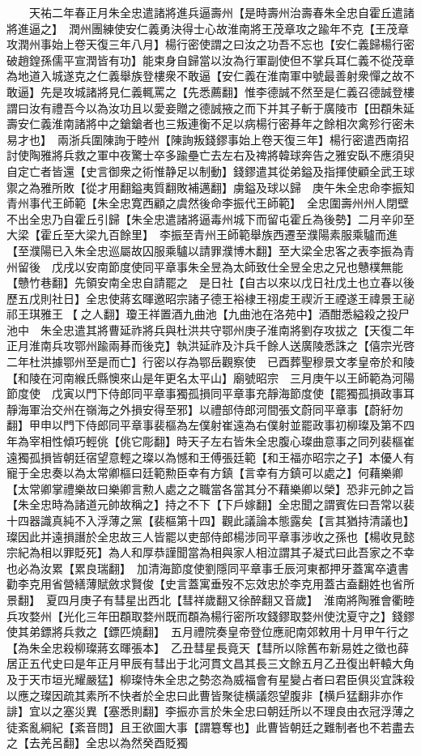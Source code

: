 　　天祐二年春正月朱全忠遣諸將進兵逼壽州【是時壽州治壽春朱全忠自霍丘遣諸將進逼之】　潤州團練使安仁義勇決得士心故淮南將王茂章攻之踰年不克【王茂章攻潤州事始上卷天復三年八月】楊行密使謂之曰汝之功吾不忘也【安仁義歸楊行密破趙鍠孫儒平宣潤皆有功】能束身自歸當以汝為行軍副使但不掌兵耳仁義不從茂章為地道入城遂克之仁義舉族登樓衆不敢逼【安仁義在淮南軍中號最善射衆憚之故不敢逼】先是攻城諸將見仁義輒罵之【先悉薦翻】惟李德誠不然至是仁義召德誠登樓謂曰汝有禮吾今以為汝功且以愛妾贈之德誠掖之而下并其子斬于廣陵市【田頵朱延壽安仁義淮南諸將中之鎗鎗者也三叛連衡不足以病楊行密朞年之餘相次禽殄行密未易才也】　兩浙兵圍陳詢于睦州【陳詢叛錢鏐事始上卷天復三年】楊行密遣西南招討使陶雅將兵救之軍中夜驚士卒多踰壘亡去左右及禆將韓球奔告之雅安臥不應須臾自定亡者皆還【史言御衆之術惟静足以制動】錢鏐遣其從弟鎰及指揮使顧全武王球禦之為雅所敗【從才用翻鎰夷質翻敗補邁翻】虜鎰及球以歸　庚午朱全忠命李振知青州事代王師範【朱全忠寛西顧之虞然後命李振代王師範】　全忠圍壽州州人閉壁不出全忠乃自霍丘引歸【朱全忠遣諸將逼毒州城下而留屯霍丘為後勢】二月辛卯至大梁【霍丘至大梁九百餘里】　李振至青州王師範舉族西遷至濮陽素服乘驢而進【至濮陽已入朱全忠巡屬故囚服乘驢以請罪濮博木翻】至大梁全忠客之表李振為青州留後　戊戌以安南節度使同平章事朱全昱為太師致仕全昱全忠之兄也戇樸無能【戇竹巷翻】先領安南全忠自請罷之　是日社【自古以來以戊日社戊土也立春以後歷五戊則社日】全忠使蔣玄暉邀昭宗諸子德王裕棣王祤䖍王禊沂王禋遂王禕景王祕祁王琪雅王【之人翻】瓊王祥置酒九曲池【九曲池在洛苑中】酒酣悉縊殺之投尸池中　朱全忠遣其將曹延祚將兵與杜洪共守鄂州庚子淮南將劉存攻拔之【天復二年正月淮南兵攻鄂州踰兩朞而後克】執洪延祚及汴兵千餘人送廣陵悉誅之【僖宗光啓二年杜洪據鄂州至是而亡】行密以存為鄂岳觀察使　已酉葬聖穆景文孝皇帝於和陵【和陵在河南緱氏縣懊來山是年更名太平山】廟號昭宗　三月庚午以王師範為河陽節度使　戊寅以門下侍郎同平章事獨孤損同平章事充靜海節度使【罷獨孤損政事耳靜海軍治交州在嶺海之外損安得至邪】以禮部侍郎河間張文蔚同平章事【蔚紆勿翻】甲申以門下侍郎同平章事裴樞為左僕射崔遠為右僕射並罷政事初柳璨及第不四年為宰相性傾巧輕佻【佻它彫翻】時天子左右皆朱全忠腹心璨曲意事之同列裴樞崔遠獨孤損皆朝廷宿望意輕之璨以為憾和王傅張廷範【和王福亦昭宗之子】本優人有寵于全忠奏以為太常卿樞曰廷範勲臣幸有方鎮【言幸有方鎮可以處之】何藉樂卿【太常卿掌禮樂故曰樂卿言勲人處之之職當各當其分不藉樂卿以榮】恐非元帥之旨【朱全忠時為諸道元帥故稱之】持之不下【下戶嫁翻】全忠聞之謂賓佐曰吾常以裴十四器識真純不入浮薄之黨【裴樞第十四】觀此議論本態露矣【言其猶持清議也】璨因此并遠損譖於全忠故三人皆罷以吏部侍郎楊涉同平章事涉收之孫也【楊收見懿宗紀為相以罪貶死】為人和厚恭謹聞當為相與家人相泣謂其子凝式曰此吾家之不幸也必為汝累【累良瑞翻】　加清海節度使劉隱同平章事壬辰河東都押牙蓋寓卒遺書勸李克用省營繕薄賦斂求賢俊【史言蓋寓垂歿不忘效忠於李克用蓋古盍翻姓也省所景翻】　夏四月庚子有彗星出西北【彗祥歲翻又徐醉翻又音歲】　淮南將陶雅會衢睦兵攻婺州【光化三年田頵取婺州既而頵為楊行密所攻錢鏐取婺州使沈夏守之】錢鏐使其弟鏢將兵救之【鏢匹燒翻】　五月禮院奏皇帝登位應祀南郊敕用十月甲午行之【為朱全忠殺柳璨蔣玄暉張本】　乙丑彗星長竟天【彗所以除舊布新易姓之徵也薛居正五代史曰是年正月甲辰有彗出于北河貫文昌其長三文餘五月乙丑復出軒轅大角及于天市垣光耀嚴猛】柳璨恃朱全忠之勢恣為威福會有星變占者曰君臣俱災宜誅殺以應之璨因疏其素所不快者於全忠曰此曹皆聚徒横議怨望腹非【横戶猛翻非亦作誹】宜以之塞災異【塞悉則翻】李振亦言於朱全忠曰朝廷所以不理良由衣冠浮薄之徒紊亂綱紀【紊音問】且王欲圖大事【謂簒奪也】此曹皆朝廷之難制者也不若盡去之【去羌呂翻】全忠以為然癸酉貶獨